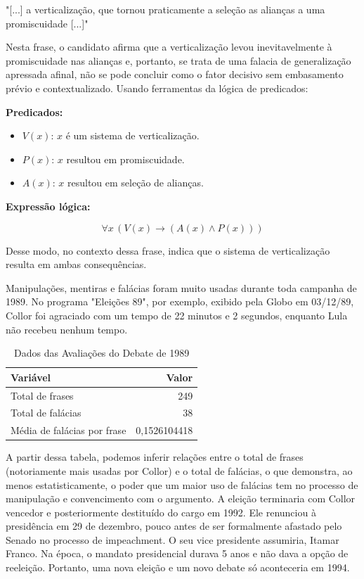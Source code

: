 \documentclass[12pt]{article}
\begin{document}
"[...] a verticalização, que tornou praticamente a seleção as alianças a uma promiscuidade [...]" 

Nesta frase, o candidato afirma que a verticalização levou inevitavelmente à promiscuidade nas alianças e, portanto, se trata de uma falacia de generalização apressada afinal, não se pode concluir como o fator decisivo sem embasamento prévio e contextualizado. Usando ferramentas da lógica de predicados:

\textbf{Predicados:}
\begin{itemize}
    \item $V(x)$: $x$ é um sistema de verticalização.
    \item $P(x)$: $x$ resultou em promiscuidade.
    \item $A(x)$: $x$ resultou em seleção de alianças.
\end{itemize}

\textbf{Expressão lógica:}

\[
\forall x \, (V(x) \rightarrow (A(x) \land P(x)))
\]

Desse modo, no contexto dessa frase, indica que o sistema de verticalização resulta em ambas consequências.

Manipulações, mentiras e falácias foram muito usadas durante toda campanha de 1989. No programa "Eleições 89", por exemplo, exibido pela Globo em 03/12/89, Collor foi agraciado com um tempo de 22 minutos e 2 segundos, enquanto Lula não recebeu nenhum tempo. \cite{Theodoro-7}


\begin{table}[ht]
\centering
\caption{Dados das Avaliações do Debate de 1989}
\label{tab:exTable1}
\begin{tabular}{l r}
\hline
\textbf{Variável} & \textbf{Valor} \\
\hline
Total de frases & 249 \\
Total de falácias & 38 \\
Média de falácias por frase & 0,1526104418 \\
\hline
\end{tabular}
\end{table}

A partir dessa tabela, podemos inferir relações entre o total de frases (notoriamente mais usadas por Collor) e o total de falácias, o que demonstra, ao menos estatisticamente, o poder que um maior uso de falácias tem no processo de manipulação e convencimento com o argumento. A eleição terminaria com Collor vencedor e posteriormente destituído do cargo em 1992. Ele renunciou à presidência em 29 de dezembro, pouco antes de ser formalmente afastado pelo Senado no processo de impeachment. O seu vice presidente assumiria, Itamar Franco. Na época, o mandato presidencial durava 5 anos e não dava a opção de reeleição. Portanto, uma nova eleição e um novo debate só aconteceria em 1994.
\end{document}
